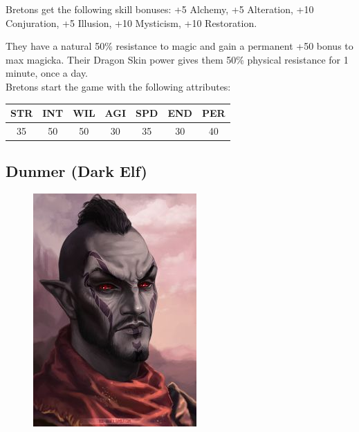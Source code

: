 \documentclass[12pt]{book}
\begin{document}
Bretons get the following skill bonuses: +5 Alchemy, +5 Alteration, +10 Conjuration, +5 Illusion, +10 Mysticism, +10 Restoration.

They have a natural 50\% resistance to magic and gain a permanent +50 bonus to max magicka. Their Dragon Skin power gives them 50\% physical resistance for 1 minute, once a day.\\

Bretons start the game with the following attributes:
\begin{center}
\begin{tabular}{|c|c|c|c|c|c|c|}
\hline
STR & INT & WIL & AGI & SPD & END & PER\\ \hline
35 & 50 & 50 & 30 & 35 & 30 & 40\\ \hline
\end{tabular}
\end{center}

\subsection{Dunmer (Dark Elf)}
\begin{figure}
	\includegraphics[width=\textwidth]{Dunmer.png}
\end{figure}
\end{document}
